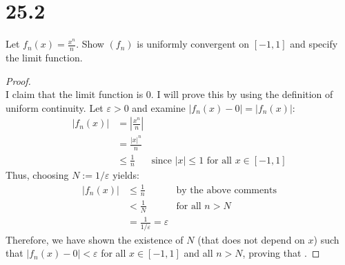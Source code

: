 \documentclass[10pt,a4paper]{article}
\theoremstyle{definition}
\begin{document}
\section*{25.2}
Let $\displaystyle f_n(x) = \frac{x^n}{n}$. Show $(f_n)$ is uniformly convergent on $[-1,1]$ and specify the limit function.

\begin{proof}{$ $}
\\I claim that the limit function is 0. I will prove this by using the definition of uniform continuity. Let $\varepsilon > 0$ and examine $|f_n(x) - 0| = |f_n(x)|$:
\begin{align*}
|f_n(x)| &= \left|\frac{x^n}{n}\right|\\
&= \frac{|x|^n}{n}\\
&\leq \frac{1}{n} &\text{since $|x| \leq 1$ for all $x \in [-1,1]$}
\end{align*}
Thus, choosing $N := 1/\varepsilon$ yields:
\begin{align*}
|f_n(x)| &\leq \frac{1}{n} &\text{by the above comments}\\
&< \frac{1}{N} &\text{for all $n > N$}\\
&= \frac{1}{1/\varepsilon} = \varepsilon
\end{align*}
Therefore, we have shown the existence of $N$ (that does not depend on $x$) such that $|f_n(x) - 0| < \varepsilon$ for all $x \in [-1,1]$ and all $n > N$, proving that .
\end{proof} 
\end{document}
